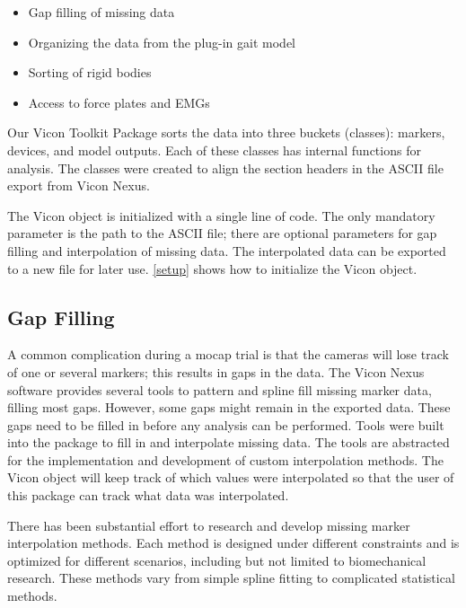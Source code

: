 \begin{itemize}[noitemsep]
    \item Gap filling of missing data 
    \item Organizing the data from the plug-in gait model 
    \item Sorting of rigid bodies
    \item Access to force plates and EMGs 
\end{itemize}


Our Vicon Toolkit Package sorts the data into three buckets (classes): markers, devices, and model outputs. Each of these classes has internal functions for analysis. The classes were created to align the section headers in the ASCII file export from Vicon Nexus. 

The Vicon object is initialized with a single line of code. The only mandatory parameter is the path to the ASCII file; there are optional parameters for gap filling and interpolation of missing data. The interpolated data can be exported to a new file for later use.  \autoref{setup} shows how to initialize the Vicon object.




\subsection{Gap Filling}

A common complication during a mocap trial is that the cameras will lose track of one or several markers; this results in gaps in the data. The Vicon Nexus software provides several tools to pattern and spline fill missing marker data, filling most gaps. However, some gaps might remain in the exported data. These gaps need to be filled in before any analysis can be performed. Tools were built into the package to fill in and interpolate missing data. The tools are abstracted for the implementation and development of custom interpolation methods. The Vicon object will keep track of which values were interpolated so that the user of this package can track what data was interpolated. 


There has been substantial effort to research and develop missing marker interpolation methods. Each method is designed under different constraints and is optimized for different scenarios, including but not limited to biomechanical research. These methods vary from simple spline fitting to complicated statistical methods. 

